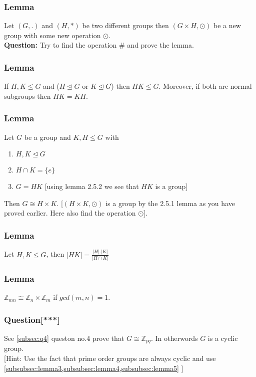 \documentclass{article}
\begin{document}
\subsubsection{Lemma}
\label{subsubsec:lemma1}
Let $(G,.)$ and $(H,*)$ be two different groups then $(G \times H,\odot)$ be a new group with some new operation $\odot$.\\

\textbf{Question:} Try to find the operation $\#$ and prove the lemma.

\subsubsection{Lemma}
\label{subsubsec:lemma2}
If $H,K\leq G$ and ($H \trianglelefteq G$ or $K \trianglelefteq G$) then $HK \leq G$. Moreover, if both are normal subgroups then $HK=KH$.

\subsubsection{Lemma}
\label{subsubsec:lemma3}
Let $G$ be a group and $K,H \leq G$ with
\begin{enumerate}
    \item $H,K \trianglelefteq G$
    \item $H \cap K =\{e\}$
    \item $G=HK$ [using lemma 2.5.2 we see that $HK$ is a group]
\end{enumerate}
Then $G \cong H\times K$. [$(H\times K,\odot)$ is a group by the 2.5.1 lemma as you have proved earlier. Here also find the operation $\odot$].

\subsubsection{Lemma}
\label{subsubsec:lemma4}
Let $H,K \leq G$, then $|HK|=\frac{|H|.|K|}{|H \cap K|}$
\subsubsection{Lemma}
\label{subsubsec:lemma5}
$\mathbb{Z}_{mn} \cong \mathbb{Z}_n \times \mathbb{Z}_m$ if $gcd(m,n)=1$.

\subsubsection{Question[***]}
\label{subsubsec:q6}
See \cref{subsec:q4} queston no.4 prove that $G \cong \mathbb{Z}_{pq}$. In otherwords $G$ is a cyclic group.\\

[Hint: Use the fact that prime order groups are always cyclic and use \cref{subsubsec:lemma3,subsubsec:lemma4,subsubsec:lemma5} ]
\end{document}
